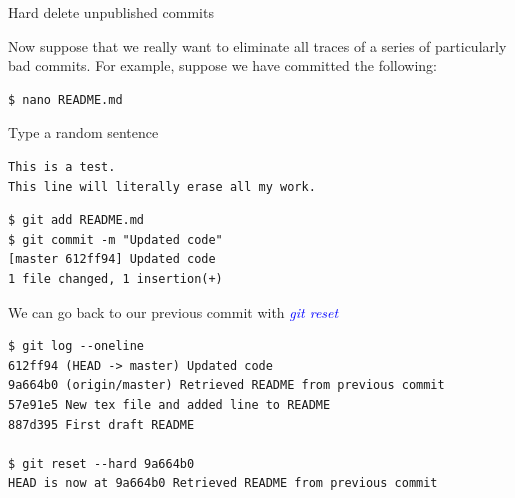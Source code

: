 \documentclass[11pt]{beamer}
\begin{document}
\begin{frame}[fragile]{Hard delete unpublished commits}

Now suppose that we really want to eliminate all traces of a series of particularly bad commits. For example, suppose we have committed the following:
\begin{lstlisting}
$ nano README.md
\end{lstlisting}
Type a random sentence
\begin{lstlisting}
This is a test.
This line will literally erase all my work.
\end{lstlisting}
\begin{lstlisting}
$ git add README.md
$ git commit -m "Updated code"
[master 612ff94] Updated code
1 file changed, 1 insertion(+)
\end{lstlisting}

We can go back to our previous commit with \textcolor{blue}{\emph{git reset}}

\begin{lstlisting}
$ git log --oneline
612ff94 (HEAD -> master) Updated code
9a664b0 (origin/master) Retrieved README from previous commit
57e91e5 New tex file and added line to README
887d395 First draft README

$ git reset --hard 9a664b0
HEAD is now at 9a664b0 Retrieved README from previous commit
\end{lstlisting}
\end{frame}
\end{document}
